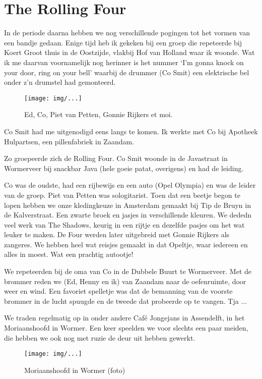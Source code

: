 \documentclass[10pt,twoside,openright]{memoir}
\begin{document}
\chapter{The Rolling Four} %
\label{cha:rollingfour}

In de periode daarna hebben we nog verschillende pogingen tot het vormen van een bandje gedaan. Enige tijd heb ik gekeken bij een groep die repeteerde bij Koert Groot thuis in de Oostzijde, vlakbij Hof van Holland waar ik woonde. Wat ik me daarvan voornamelijk nog herinner is het nummer `I’m gonna knock on your door, ring on your bell' waarbij de drummer (Co Smit) een elektrische bel onder z’n drumstel had gemonteerd.

\begin{figure}[t]
\texttt{[image: img/...]}
\caption{Ed, Co, Piet van Petten, Gonnie Rijkers et moi.}
\end{figure}

Co Smit had me uitgenodigd eens langs te komen. Ik werkte met Co bij Apotheek Hulpartsen, een pillenfabriek in Zaandam.

Zo groepeerde zich de Rolling Four. Co Smit woonde in de Javastraat in Wormerveer bij snackbar Java (hele goeie patat, overigens) en had de leiding.

Co was de oudste, had een rijbewijs en een auto (Opel Olympia) en was de leider van de groep. Piet van Petten was sologitarist. Toen dat een beetje begon te lopen hebben we onze kledingkeuze in Amsterdam gemaakt bij Tip de Bruyn in de Kalverstraat. Een zwarte broek en jasjes in verschillende kleuren. We dededn veel werk van The Shadows, keurig in een rijtje en dezelfde pasjes om het wat leuker te maken. De Four werden later uitgebreid met Gonnie Rijkers als zangeres. We hebben heel wat reisjes gemaakt in dat Opeltje, waar iedereen en alles in moest. Wat een prachtig autootje!

We repeteerden bij de oma van Co in de Dubbele Buurt te Wormerveer. Met de brommer reden we (Ed, Henny en ik) van Zaandam naar de oefenruimte, door weer en wind. Een favoriet spelletje was dat de bemanning van de voorste brommer in de lucht spuugde en de tweede dat probeerde op te vangen. Tja ...

We traden regelmatig op in onder andere Café Jongejans in Assendelft, in het Moriaanshoofd in Wormer. Een keer speelden we voor slechts een paar meiden, die hebben we ook nog met ruzie de deur uit hebben gewerkt. 

\begin{figure}[t]
\texttt{[image: img/...]}
\caption{Moriaanshoofd in Wormer (foto)}
\end{figure}
\end{document}
